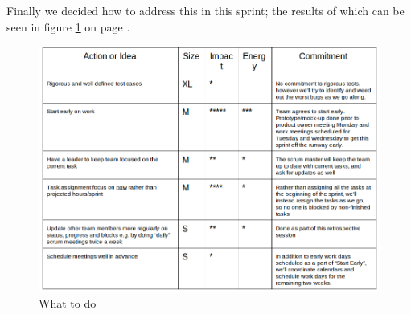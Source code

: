 \documentclass[a4paper,11pt]{article}
\begin{document}
Finally we decided how to address this in this sprint; the results of which can be seen in figure \ref{whattodo} on page \pageref{whattodo}.

  \begin{figure}[ht!]
  	\begin{center}
  	\includegraphics[width=\textwidth]{whattodo.png}		
  	\end{center}
  	\caption{What to do}
  	\label{whattodo}
  \end{figure}
\end{document}
